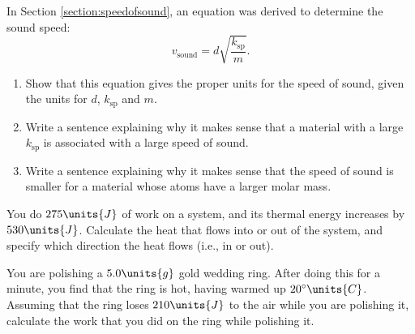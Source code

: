 \begin{problem}
In Section \ref{section:speedofsound}, an equation was derived to
determine the sound speed:
\begin{equation*}
v_\text{sound} =  d\sqrt{\frac{k_\text{sp}}{m}}.
\end{equation*}
\begin{enumerate}
\item Show that this equation gives the proper units for the speed
of sound, given the units for $d$, $k_\text{sp}$ and $m$.
\item Write a sentence explaining why it makes sense that a material
with a large $k_\text{sp}$ is associated with a large speed of sound.
\item Write a sentence explaining why it makes sense that
the speed of sound is smaller for a material whose atoms have a 
larger molar mass. 
\end{enumerate}
\end{problem}

\begin{problem}
You do $275\units{J}$ of work on a system, and its thermal energy 
increases by $530\units{J}$.  Calculate the heat that flows into 
or out of the system, and specify which direction the heat flows 
(i.e., in or out).
\end{problem}

\begin{problem}
You are polishing a $5.0\units{g}$ gold wedding ring.  After doing
this for a minute, you find that the ring is hot, having warmed up
$20^{\circ}\units{C}$.  Assuming that the ring loses $210\units{J}$
to the air while you are polishing it, calculate the work that you did
on the ring while polishing it.
\label{prob:polish_ring}
\end{problem}
